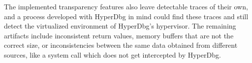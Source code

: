 The implemented transparency features also leave detectable traces of their own, and a process developed with HyperDbg in mind could find these 
traces and still detect the virtualized environment of HyperDbg's hypervisor. The remaining artifacts include inconsistent return values, memory buffers 
that are not the correct size, or inconsistencies between the same data obtained from different sources, like a system call which does not get intercepted by HyperDbg.



